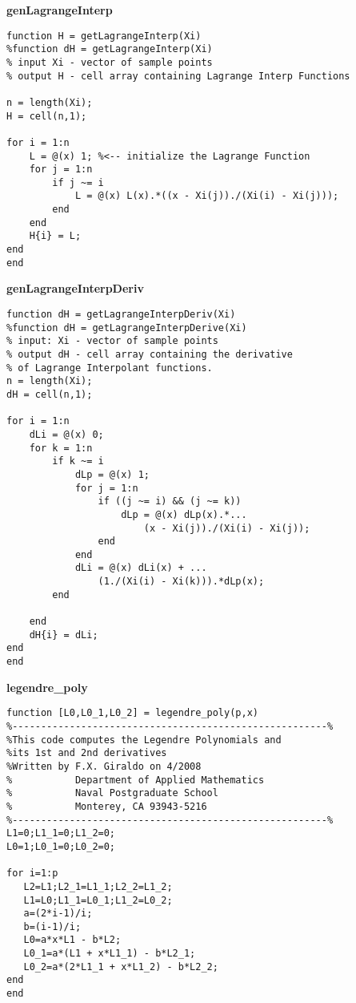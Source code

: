 \vspace{0.5cm}

\noindent\textbf{genLagrangeInterp}

\begin{lstlisting}[style=myMatlab,name=lec34n-ex2]
function H = getLagrangeInterp(Xi)
%function dH = getLagrangeInterp(Xi)
% input Xi - vector of sample points
% output H - cell array containing Lagrange Interp Functions

n = length(Xi);
H = cell(n,1);

for i = 1:n
    L = @(x) 1; %<-- initialize the Lagrange Function
    for j = 1:n
        if j ~= i
            L = @(x) L(x).*((x - Xi(j))./(Xi(i) - Xi(j)));
        end
    end
    H{i} = L;
end
end
\end{lstlisting}

\vspace{0.5cm}

\noindent\textbf{genLagrangeInterpDeriv}

\begin{lstlisting}[style=myMatlab,name=lec34n-ex2]
function dH = getLagrangeInterpDeriv(Xi)
%function dH = getLagrangeInterpDerive(Xi)
% input: Xi - vector of sample points
% output dH - cell array containing the derivative 
% of Lagrange Interpolant functions.
n = length(Xi);
dH = cell(n,1);

for i = 1:n
    dLi = @(x) 0;
    for k = 1:n
        if k ~= i
            dLp = @(x) 1;
            for j = 1:n
                if ((j ~= i) && (j ~= k))
                    dLp = @(x) dLp(x).*...
                        (x - Xi(j))./(Xi(i) - Xi(j));
                end
            end
            dLi = @(x) dLi(x) + ...
                (1./(Xi(i) - Xi(k))).*dLp(x);
        end
        
    end
    dH{i} = dLi;
end
end
\end{lstlisting}

\vspace{3.5cm}

\noindent\textbf{legendre\_poly}

\begin{lstlisting}[style=myMatlab,name=lec34n-ex2]
function [L0,L0_1,L0_2] = legendre_poly(p,x)
%-------------------------------------------------------%
%This code computes the Legendre Polynomials and 
%its 1st and 2nd derivatives
%Written by F.X. Giraldo on 4/2008
%           Department of Applied Mathematics
%           Naval Postgraduate School 
%           Monterey, CA 93943-5216
%-------------------------------------------------------%
L1=0;L1_1=0;L1_2=0;
L0=1;L0_1=0;L0_2=0;

for i=1:p
   L2=L1;L2_1=L1_1;L2_2=L1_2;
   L1=L0;L1_1=L0_1;L1_2=L0_2;
   a=(2*i-1)/i;
   b=(i-1)/i;
   L0=a*x*L1 - b*L2;
   L0_1=a*(L1 + x*L1_1) - b*L2_1;
   L0_2=a*(2*L1_1 + x*L1_2) - b*L2_2;
end
end
\end{lstlisting}

